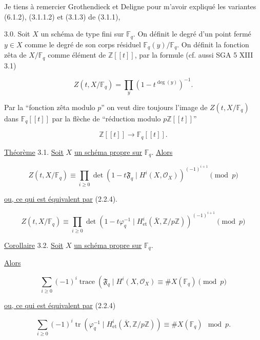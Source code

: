 Je tiens à remercier Grothendieck et Deligne pour m'avoir expliqué les
variantes (6.1.2), (3.1.1.2) et (3.1.3) de (3.1.1),

3.0. Soit $X$ un schéma de type fini sur $\mathbb F_q$. On définit le degré
d'un point fermé $y\in X$ comme le degré de son corps résiduel
$\mathbb F_q(y)/\mathbb F_q$. On définit la fonction zêta de
$X/\mathbb F_q$ comme élément de $\mathbb Z[[t]]$, par la formule
(cf. aussi SGA 5 XIII 3.1)

\begin{equation}\tag{3.0.1}
Z(t,X/\mathbb F_q)=\prod_y(1-t^{\deg(y)})^{-1}.
\end{equation}

Par la ``fonction zêta modulo $p$'' on veut dire toujours l'image de
$Z(t,X/\mathbb F_q)$ dans $\mathbb F_q[[t]]$ par la flèche de ``réduction
modulo $p\mathbb Z[[t]]$''

\[
\mathbb Z[[t]]\longrightarrow\mathbb F_q[[t]].
\]

\underline{Théorème} 3.1. \underline{Soit} $X$ \underline{un schéma propre sur}
$\mathbb F_q$. \underline{Alors}

\begin{equation}\tag{3.1.1}
Z(t,X/\mathbb F_q)
\equiv
\prod_{i\geq0}
\det\!\left(1-t\mathfrak F_q\mid H^i(X,\mathcal O_X)\right)^{(-1)^{i+1}}
\pmod p
\end{equation}

\underline{ou, ce qui est équivalent par} (2.2.4).

\begin{equation}\tag{3.1.2}
Z(t,X/\mathbb F_q)
\equiv
\prod_{i\geq0}
\det\!\left(1-t\varphi_q^{-1}\mid
H^i_{\mathrm{et}}(\bar X,\mathbb Z/p\mathbb Z)\right)^{(-1)^{i+1}}
\pmod p
\end{equation}

\underline{Corollaire} 3.2. \underline{Soit} $X$ \underline{un schéma propre sur}
$\mathbb F_q$.

\underline{Alors}

\begin{equation}\tag{3.2.1}
\sum_{i\geq0}(-1)^i
\operatorname{trace}\!\left(\mathfrak F_q\mid H^i(X,\mathcal O_X)\right.
\equiv \#X(\mathbb F_q)\pmod p
\end{equation}

\underline{ou, ce qui est équivalent par} (2.2.4)


\begin{equation}\tag{3.2.2}
\sum_{i\geq0}(-1)^i
\operatorname{tr}\!\left(\varphi_q^{-1}\mid
H^i_{\mathrm{et}}(\bar X,\mathbb Z/p\mathbb Z)\right)
\equiv \#X(\mathbb F_q)\mod p.
\end{equation}

